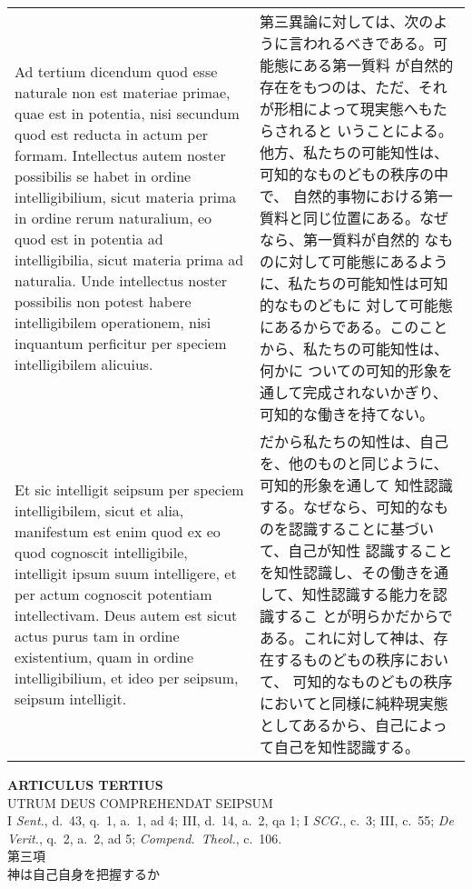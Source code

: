 \documentclass[10pt]{jsarticle} %
\begin{document}
\begin{longtable}{p{21em}p{21em}}
\\


Ad tertium dicendum quod esse naturale non
est materiae primae, quae est in potentia, nisi secundum quod est
reducta in actum per formam. Intellectus autem noster possibilis se
habet in ordine intelligibilium, sicut materia prima in ordine rerum
naturalium, eo quod est in potentia ad intelligibilia, sicut materia
prima ad naturalia. Unde intellectus noster possibilis non potest habere
intelligibilem operationem, nisi inquantum perficitur per speciem
intelligibilem alicuius. 

&

第三異論に対しては、次のように言われるべきである。可能態にある第一質料
が自然的存在をもつのは、ただ、それが形相によって現実態へもたらされると
いうことによる。他方、私たちの可能知性は、可知的なものどもの秩序の中で、
自然的事物における第一質料と同じ位置にある。なぜなら、第一質料が自然的
なものに対して可能態にあるように、私たちの可能知性は可知的なものどもに
対して可能態にあるからである。このことから、私たちの可能知性は、何かに
ついての可知的形象を通して完成されないかぎり、可知的な働きを持てない。


\\

Et sic intelligit seipsum per speciem
intelligibilem, sicut et alia, manifestum est enim quod ex eo quod
cognoscit intelligibile, intelligit ipsum suum intelligere, et per actum
cognoscit potentiam intellectivam. Deus autem est sicut actus purus tam
in ordine existentium, quam in ordine intelligibilium, et ideo per
seipsum, seipsum intelligit.


&

だから私たちの知性は、自己を、他のものと同じように、可知的形象を通して
知性認識する。なぜなら、可知的なものを認識することに基づいて、自己が知性
認識することを知性認識し、その働きを通して、知性認識する能力を認識するこ
とが明らかだからである。これに対して神は、存在するものどもの秩序において、
可知的なものどもの秩序においてと同様に純粋現実態としてあるから、自己によっ
て自己を知性認識する。



\end{longtable}
\newpage

\begin{center}
 {\Large {\bf ARTICULUS TERTIUS}}\\
 {\large UTRUM DEUS COMPREHENDAT SEIPSUM}\\
 {\footnotesize I {\itshape Sent.}, d.~43, q.~1, a.~1, ad 4; III, d.~14,
 a.~2, qa 1; I {\itshape SCG.}, c.~3; III, c.~55; {\itshape De Verit.},
 q.~2, a.~2, ad 5; {\itshape Compend.~Theol.}, c.~106.}\\
 {\Large 第三項\\神は自己自身を把握するか}
\end{center}
\end{document}
